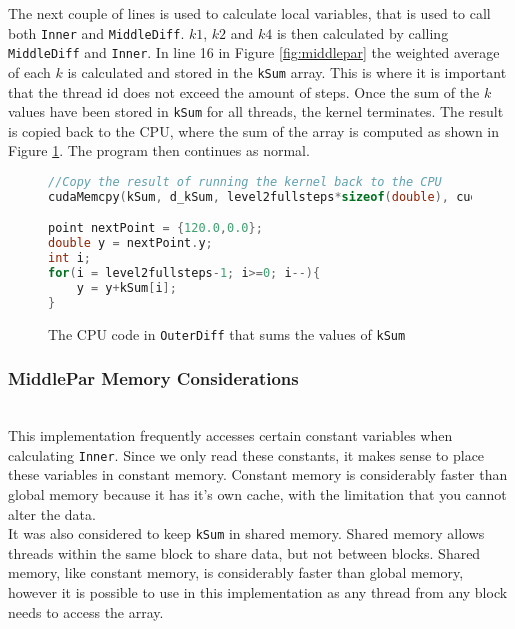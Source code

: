 The next couple of lines is used to calculate local variables, that is used to call both \texttt{Inner} and \texttt{MiddleDiff}. $k1$, $k2$ and $k4$ is then calculated by calling \texttt{MiddleDiff} and \texttt{Inner}. In line 16 in Figure \ref{fig:middlepar} the weighted average of each $k$ is calculated and stored in the \texttt{kSum} array. This is where it is important that the thread id does not exceed the amount of steps. Once the sum of the $k$ values have been stored in \texttt{kSum} for all threads, the kernel terminates. The result is copied back to the CPU, where the sum of the array is computed as shown in Figure \ref{fig:middleparcpu}. The program then continues as normal.

\begin{figure}[H]
\begin{lstlisting}[language=c]
//Copy the result of running the kernel back to the CPU
cudaMemcpy(kSum, d_kSum, level2fullsteps*sizeof(double), cudaMemcpyDeviceToHost);

point nextPoint = {120.0,0.0};
double y = nextPoint.y;
int i;
for(i = level2fullsteps-1; i>=0; i--){
	y = y+kSum[i];
}
\end{lstlisting}
\caption{The CPU code in \texttt{OuterDiff} that sums the values of \texttt{kSum}}
\label{fig:middleparcpu}
\end{figure}

\subsubsection{MiddlePar Memory Considerations} \hfill \\
This implementation frequently accesses certain constant variables when calculating \texttt{Inner}. Since we only read these constants, it makes sense to place these variables in constant memory. Constant memory is considerably faster than global memory\cite{bpg} because it has it's own cache, with the limitation that you cannot alter the data.\\

It was also considered to keep \texttt{kSum} in shared memory. Shared memory allows threads within the same block to share data, but not between blocks. Shared memory, like constant memory, is considerably faster than global memory, however it is possible to use in this implementation as any thread from any block needs to access the array.

